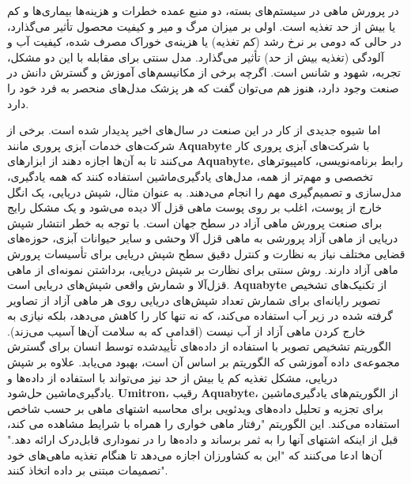 در پرورش ماهی در سیستم‌های بسته، دو منبع عمده خطرات و هزینه‌ها بیماری‌ها و کم یا بیش از حد تغذیه است.
اولی بر میزان مرگ و میر و کیفیت محصول تأثیر می‌گذارد، در حالی که دومی بر نرخ رشد (کم تغذیه) یا هزینه‌ی خوراک مصرف شده، کیفیت آب و آلودگی (تغذیه بیش از حد) تأثیر می‌گذارد.
مدل سنتی برای مقابله با این دو مشکل، تجربه، شهود و شانس است.
اگرچه برخی از مکانیسم‌های آموزش و گسترش دانش در صنعت وجود دارد، هنوز هم می‌توان گفت که هر پزشک مدل‌های منحصر به فرد خود را دارد.

اما شیوه جدیدی از کار در این صنعت در سال‌های اخیر پدیدار شده است.
برخی از شرکت‌های خدمات آبزی پروری مانند \textenglish{\textbf{Aquabyte}} با شرکت‌های آبزی پروری کار می‌کنند تا به آن‌ها اجازه دهند از ابزارهای \textenglish{\textbf{Aquabyte}}، رابط برنامه‌نویسی، کامپیوترهای تخصصی و مهم‌تر از همه، مدل‌های یادگیری‌ماشین استفاده کنند که همه یادگیری، مدل‌سازی و تصمیم‌گیری مهم را انجام می‌دهند.
به عنوان مثال، شپش دریایی، یک انگل خارج از پوست، اغلب بر روی پوست ماهی قزل آلا دیده می‌شود و یک مشکل رایج برای صنعت پرورش ماهی آزاد در سطح جهان است.
با توجه به خطر انتشار شپش دریایی از ماهی آزاد پرورشی به ماهی قزل آلا وحشی و سایر حیوانات آبزی، حوزه‌های قضایی مختلف نیاز به نظارت و کنترل دقیق سطح شپش دریایی برای تأسیسات پرورش ماهی آزاد دارند.
روش سنتی برای نظارت بر شپش دریایی، برداشتن نمونه‌ای از ماهی قزل‌آلا و شمارش واقعی شپش‌های دریایی است.
\textenglish{\textbf{Aquabyte}} از تکنیک‌های تشخیص تصویر رایانه‌ای برای شمارش تعداد شپش‌های دریایی روی هر ماهی آزاد از تصاویر گرفته شده در زیر آب استفاده می‌کند، که نه تنها کار را کاهش می‌دهد، بلکه نیازی به خارج کردن ماهی آزاد از آب نیست (اقدامی که به سلامت آن‌ها آسیب می‌زند).
الگوریتم تشخیص تصویر با استفاده از داده‌های تأیید‌شده توسط انسان برای گسترش مجموعه‌ی داده آموزشی که الگوریتم بر اساس آن است، بهبود می‌یابد.
علاوه بر شپش دریایی، مشکل تغذیه کم یا بیش از حد نیز می‌تواند با استفاده از داده‌ها و یادگیری‌ماشین حل‌شود.
\textenglish{\textbf{Umitron}}، رقیب \textenglish{\textbf{Aquabyte}}، از الگوریتم‌های یادگیری‌ماشین برای تجزیه و تحلیل داده‌های ویدئویی برای محاسبه اشتهای ماهی بر حسب شاخص استفاده می‌کند.
این الگوریتم "رفتار ماهی خواری را همراه با شرایط مشاهده می کند، قبل از اینکه اشتهای آنها را به ثمر برساند و داده‌ها را در نموداری قابل‌درک ارائه دهد." آن‌ها ادعا می‌کنند که "این به کشاورزان اجازه می‌دهد تا هنگام تغذیه ماهی‌های خود تصمیمات مبتنی بر داده اتخاذ کنند".

